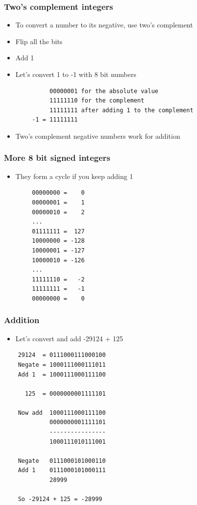 \documentclass{beamer}
\begin{document}
\begin{frame}[fragile]
    \frametitle{Two's complement integers}
    \begin{itemize}
        \item To convert a number to its negative, use two's complement
        \item Flip all the bits
        \item Add 1
        \item Let's convert 1 to -1 with 8 bit numbers
    \end{itemize}
    \begin{verbatim}
             00000001 for the absolute value
             11111110 for the complement
             11111111 after adding 1 to the complement
        -1 = 11111111
    \end{verbatim}
    \begin{itemize}
        \item Two's complement negative numbers work for addition
    \end{itemize}
\end{frame}

\begin{frame}[fragile]
    \frametitle{More 8 bit signed integers}
    \begin{itemize}
        \item They form a cycle if you keep adding 1
    \end{itemize}
    \begin{verbatim}
        00000000 =    0
        00000001 =    1
        00000010 =    2
        ...
        01111111 =  127
        10000000 = -128
        10000001 = -127
        10000010 = -126
        ...
        11111110 =   -2
        11111111 =   -1
        00000000 =    0
    \end{verbatim}
\end{frame}

\begin{frame}[fragile]
\frametitle{Addition}
\small
\begin{itemize}
    \item Let's convert and add -29124 + 125
\end{itemize}
\begin{verbatim}
    29124  = 0111000111000100
    Negate = 1000111000111011
    Add 1  = 1000111000111100

      125  = 0000000001111101

    Now add  1000111000111100
             0000000001111101
             ----------------
             1000111010111001

    Negate   0111000101000110
    Add 1    0111000101000111
             28999

    So -29124 + 125 = -28999
\end{verbatim}
\end{frame}
\end{document}

